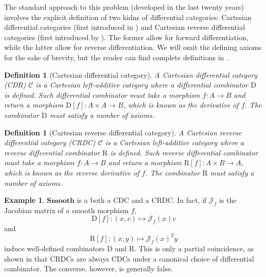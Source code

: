 \documentclass[12pt,a4paper,openright,twoside]{report}
\theoremstyle{plain}
\newtheorem{definition}[proposition]{Definition}
\theoremstyle{definition}
\newtheorem{example}[proposition]{Example}
\begin{document}
The standard approach to this problem (developed in the last twenty years) involves the explicit definition of two kidns of differential categories: Cartesian differential categories (first introduced in \cite{blute2006differential}) and Cartesian reverse differential categories (first introduced by \cite{cockett2019reverse}). The former allow for forward differentiation, while the latter allow for reverse differentiation. We will omit the defining axioms for the sake of brevity, but the reader can find complete definitions in \cite{cockett2019reverse}.

\begin{definition}[Cartesian differential category]
  A Cartesian differential category (CDR) $\mathcal{C}$ is a Cartesian left-additive category where a differential combinator $\mathrm{D}$ is defined. Such differential combinator must take a morphism $f: A \to B$ and return a morphism $\mathrm{D}[f]: A \times A \to B$, which is known as the derivative of $f$. The combinator $\mathrm{D}$ must satisfy a number of axioms. 
\end{definition}

\begin{definition}[Cartesian reverse differential category]
  A Cartesian reverse differential category (CRDC) $\mathcal{C}$ is a Cartesian left-additive category where a reverse differential combinator $\mathrm{R}$ is defined. Such reverse differential combinator must take a morphism $f: A \to B$ and return a morphism $\mathrm{R}[f]: A \times B \to A$, which is known as the reverse derivative of $f$. The combinator $\mathrm{R}$ must satisfy a number of axioms. 
\end{definition}

\begin{example}
  $\mathbf{Smooth}$ is a both a CDC and a CRDC. In fact, if $\mathcal{J}_f$ is the Jacobian matrix of a smooth morphism $f$,
  \[\mathrm{D}[f]: (x,v) \mapsto \mathcal{J}_f(x)v\]
  and
  \[\mathrm{R}[f]: (x,y) \mapsto \mathcal{J}_f(x)^Ty\]
  induce well-defined combinators $\mathrm{D}$ and $\mathrm{R}$. This is only a partial coincidence, as shown in \cite{cockett2019reverse} that CRDCs are always CDCs under a canonical choice of differential combinator. The converse, however, is generally false.
\end{example}
\end{document}
